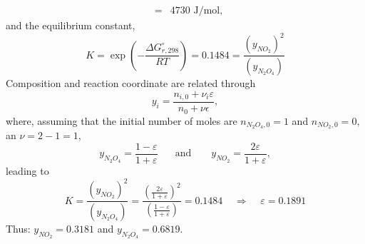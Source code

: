 \documentclass[calculator,allquestions,datasheet,solutions]{exam_newMarcus2}
\newcommand{\frc}{\displaystyle\frac}
\begin{document}
\begin{question}
\begin{enumerate}[a)]
{\begin{eqnarray}
                             &=& 4730 \text{ J/mol}, \nonumber
         \end{eqnarray}
         and the equilibrium constant,
         \begin{displaymath}
             K = \exp\left(-\frc{\Delta G^{\circ}_{r,298}}{RT}\right) = 0.1484 = \frac{\left(y_{NO_{2}}\right)^{2}}{\left(y_{N_{2}O_{4}}\right)}
         \end{displaymath}
         Composition and reaction coordinate are related through
         \begin{displaymath}
            y_{i} = \frc{n_{i,0} + \nu_{i}\varepsilon}{n_{0}+\nu\epsilon},
         \end{displaymath}
         where, assuming that the initial number of moles are $n_{N_{2}O_{4},0}=1$ and $n_{NO_{2},0}=0$, an $\nu= 2-1 = 1$,~
         \begin{displaymath}
            y_{N_{2}O_{4}} = \frc{1-\varepsilon}{1+\varepsilon}\;\;\;\;\;\text{ and }\;\;\;\;\;\; y_{NO_{2}} = \frc{2\varepsilon}{1+\varepsilon},
         \end{displaymath}
         leading to~
         \begin{displaymath}
             K = \frac{\left(y_{NO_{2}}\right)^{2}}{\left(y_{N_{2}O_{4}}\right)} = \frc{\left(\frc{2\varepsilon}{1+\varepsilon}\right)^{2}}{\left(\frc{1-\varepsilon}{1+\varepsilon}\right)} = 0.1484 \;\;\;\;\Longrightarrow\;\;\;\; \varepsilon = 0.1891
         \end{displaymath}
         Thus: $y_{NO_{2}} = 0.3181$ and $y_{N_{2}O_{4}} = 0.6819$.~
           }


\end{enumerate}
\end{question}
\end{document}
